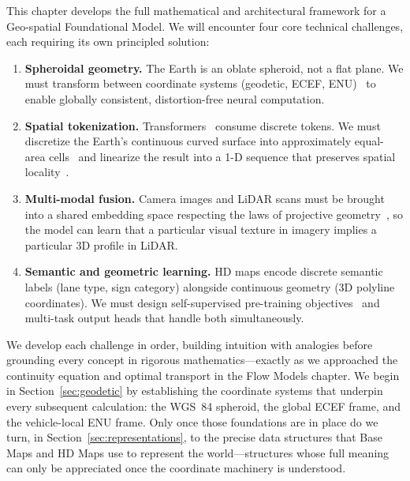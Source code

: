\documentclass{book}
\begin{document}
This chapter develops the full mathematical and architectural framework
for a Geo-spatial Foundational Model.  We will encounter four
core technical challenges, each requiring its own principled solution:

\begin{enumerate}
\item \textbf{Spheroidal geometry.}  The Earth is an oblate spheroid,
  not a flat plane.  We must transform between coordinate systems
  (geodetic, ECEF, ENU)~\cite{nima2000wgs84} to enable globally
  consistent, distortion-free neural computation.

\item \textbf{Spatial tokenization.}  Transformers~\cite{vaswani2017attention}
  consume discrete tokens.  We must discretize the Earth's continuous
  curved surface into approximately equal-area cells~\cite{s2geometry}
  and linearize the result into a 1-D sequence that preserves spatial
  locality~\cite{hilbert1891}.

\item \textbf{Multi-modal fusion.}  Camera images and LiDAR scans must
  be brought into a shared embedding space respecting the laws of
  projective geometry~\cite{hartley2003multiple}, so the model can
  learn that a particular visual texture in imagery implies a
  particular 3D profile in LiDAR.

\item \textbf{Semantic and geometric learning.}  HD maps encode
  discrete semantic labels (lane type, sign category) alongside
  continuous geometry (3D polyline coordinates).  We must design
  self-supervised pre-training objectives~\cite{he2022masked} and
  multi-task output heads that handle both simultaneously.
\end{enumerate}

We develop each challenge in order, building intuition with analogies
before grounding every concept in rigorous mathematics---exactly as we
approached the continuity equation and optimal transport in the Flow
Models chapter.  We begin in Section~\ref{sec:geodetic} by establishing
the coordinate systems that underpin every subsequent calculation:
the WGS~84 spheroid, the global ECEF frame, and the vehicle-local
ENU frame.  Only once those foundations are in place do we turn, in
Section~\ref{sec:representations}, to the precise data structures
that Base Maps and HD Maps use to represent the world---structures
whose full meaning can only be appreciated once the coordinate
machinery is understood.
\end{document}
